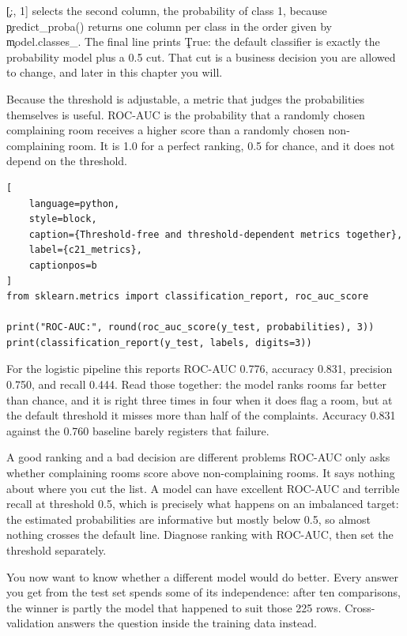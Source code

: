 \c{[:, 1]} selects the second column, the probability of class 1, because
\c{predict_proba()} returns one column per class in the order given by
\c{model.classes_}. The final line prints \c{True}: the default classifier is
exactly the probability model plus a 0.5 cut. That cut is a business decision
you are allowed to change, and later in this chapter you will.


Because the threshold is adjustable, a metric that judges the probabilities
themselves is useful. ROC-AUC is the probability that a randomly chosen
complaining room receives a higher score than a randomly chosen
non-complaining room. It is 1.0 for a perfect ranking, 0.5 for chance, and it
does not depend on the threshold.

\begin{lstlisting}[
    language=python,
    style=block,
    caption={Threshold-free and threshold-dependent metrics together},
    label={c21_metrics},
    captionpos=b
]
from sklearn.metrics import classification_report, roc_auc_score

print("ROC-AUC:", round(roc_auc_score(y_test, probabilities), 3))
print(classification_report(y_test, labels, digits=3))
\end{lstlisting}

For the logistic pipeline this reports ROC-AUC 0.776, accuracy 0.831, precision
0.750, and recall 0.444. Read those together: the model ranks rooms far better
than chance, and it is right three times in four when it does flag a room, but
at the default threshold it misses more than half of the complaints. Accuracy
0.831 against the 0.760 baseline barely registers that failure.

\begin{ExplainBox}{A good ranking and a bad decision are different problems}
ROC-AUC only asks whether complaining rooms score above non-complaining rooms.
It says nothing about where you cut the list. A model can have excellent ROC-AUC
and terrible recall at threshold 0.5, which is precisely what happens on an
imbalanced target: the estimated probabilities are informative but mostly below
0.5, so almost nothing crosses the default line. Diagnose ranking with ROC-AUC,
then set the threshold separately.
\end{ExplainBox}


You now want to know whether a different model would do better. Every answer you
get from the test set spends some of its independence: after ten comparisons, the
winner is partly the model that happened to suit those 225 rows.
Cross-validation answers the question inside the training data instead.

